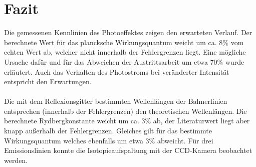 \section{Fazit}
Die gemessenen Kennlinien des Photoeffektes zeigen den erwarteten Verlauf. Der berechnete Wert für das plancksche Wirkungsquantum weicht um ca. $8\%$ vom echten Wert ab, welcher nicht innerhalb der Fehlergrenzen liegt. Eine mögliche Ursache dafür und für das Abweichen der Austrittsarbeit um etwa $70\%$ wurde erläutert. Auch das Verhalten des Photostroms bei veränderter Intensität entspricht den Erwartungen. \\ \\
Die mit dem Reflexionsgitter bestimmten Wellenlängen der Balmerlinien entsprechen (innerhalb der Fehlergrenzen) den theoretischen Wellenlängen. Die berechnete Rydbergkonstante weicht um ca. $3\%$ ab, der Literaturwert liegt aber knapp außerhalb der Fehlergrenzen. Gleiches gilt für das bestimmte Wirkungsquantum welches ebenfalls um etwa $3\%$ abweicht. Für drei Emissionslinien konnte die Isotopieaufspaltung mit der CCD-Kamera beobachtet werden. 
